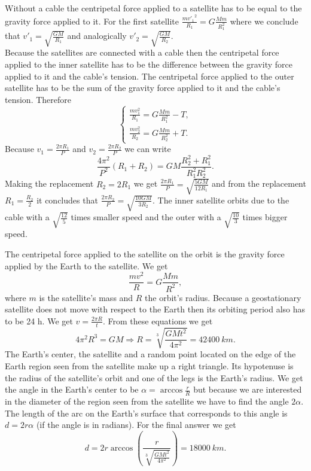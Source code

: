 \documentclass[11pt]{article}
\begin{document}
\solueng
Without a cable the centripetal force applied to a satellite has to be equal to the gravity force applied to it. For the first satellite $\frac{{mv'_1}^2}{R_1}=G\frac{Mm}{R_1^2}$ where we conclude that $v'_1=\sqrt{\frac{GM}{R_1}}$ and analogically $v'_2=\sqrt{\frac{GM}{R_2}}$.\\
Because the satellites are connected with a cable then the centripetal force applied to the inner satellite has to be the difference between the gravity force applied to it and the cable’s tension. The centripetal force applied to the outer satellite has to be the sum of the gravity force applied to it and the cable’s tension. Therefore
$$\begin{cases}
\frac{mv_1^2}{R_1}=G\frac{Mm}{R_1^2}-T,\\
\frac{mv_2^2}{R_2}=G\frac{Mm}{R_2^2}+T.
\end{cases}$$
Because $v_1=\frac{2\pi R_1}{P}$ and $v_2=\frac{2\pi R_2}{P}$ we can write 
$$\frac{4\pi^2}{P^2}\left(R_1+R_2\right)=GM\frac{R_2^2+R_1^2}{R_1^2R_2^2}.$$
Making the replacement $R_2=2R_1$ we get $\frac{2\pi R_1}{P}=\sqrt{\frac{5GM}{12R_1}}$ and from the replacement $R_1=\frac{R_2}{2}$ it concludes that $\frac{2\pi R_2}{P}=\sqrt{\frac{10GM}{3R_2}}$. The inner satellite orbits due to the cable with a $\sqrt{\frac{12}{5}}$ times smaller speed and the outer with a $\sqrt{\frac{10}{3}}$ times bigger speed.
\probend
\bigskip


\solueng
The centripetal force applied to the satellite on the orbit is the gravity force applied by the Earth to the satellite. We get 
$$\frac{mv^2}{R}=G\frac{Mm}{R^2},$$
where $m$ is the satellite’s mass and $R$ the orbit’s radius. Because a geostationary satellite does not move with respect to the Earth then its orbiting period also has to be 24 h. We get $v=\frac{2\pi R}{t}$. From these equations we get
$$4\pi^2 R^3=GM \Rightarrow R=\sqrt[3]{\frac{GMt^2}{4\pi^2}}=\SI{42400}{km}.$$
The Earth’s center, the satellite and a random point located on the edge of the Earth region seen from the satellite make up a right triangle. Its hypotenuse is the radius of the satellite’s orbit and one of the legs is the Earth’s radius. We get the angle in the Earth’s center to be $\alpha=\arccos{\frac{r}{R}}$ but because we are interested in the diameter of the region seen from the satellite we have to find the angle $2\alpha$. The length of the arc on the Earth’s surface that corresponds to this angle is $d=2r\alpha$ (if the angle is in radians). For the final answer we get
$$d=2r\arccos \left(\frac{r}{\sqrt[3]{\frac{GMt^2}{4\pi^2}}}\right) =\SI{18000}{km}.$$
\probend
\bigskip
\end{document}
